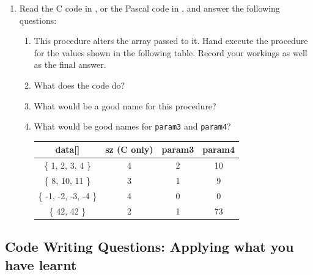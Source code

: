 \begin{enumerate}
  \clearpage
  \item Read the C code in , or the Pascal code in , and answer the following questions:
  \begin{enumerate}
    \item This procedure alters the array passed to it. Hand execute the procedure for the values shown in the following table. Record your workings as well as the final answer.
    \item What does the code do?
    \item What would be a good name for this procedure?
    \item What would be good names for \texttt{param3} and \texttt{param4}?
    
    \begin{table}[h]
      \centering
      \begin{tabular}{|c|c|c|c|}
      \hline
       \textbf{data[]} & \textbf{sz} (C only)  & \textbf{param3} & \textbf{param4}  \\
       \hline 
       \{ 1, 2, 3, 4 \} & 4 & 2 & 10 \\
       \hline
       \{ 8, 10, 11 \} & 3 & 1 & 9 \\
       \hline
       \{ -1, -2, -3, -4 \} & 4 & 0 & 0 \\
       \hline
       \{ 42, 42 \} & 2 & 1 & 73 \\
       \hline
      \end{tabular}
    \end{table}
    
      \end{enumerate}
  \begin{figure}[h]
  \end{figure}
  \begin{figure}[h]
  \end{figure}

\end{enumerate}
\clearpage
\subsection{Code Writing Questions: Applying what you have learnt} %
\label{sub:code_writing_questions_applying_what_you_have_learnt_array}


